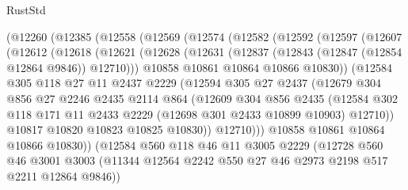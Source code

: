 \begin{lexlean}{RustStd}
\begin{coremodule}
    (@12260
      (@12385
        (@12558
          (@12569
            (@12574
              (@12582
                (@12592
                  (@12597
                    (@12607
                      (@12612
                        (@12618
                          (@12621
                            (@12628
                              (@12631 (@12837 (@12843 (@12847 (@12854 @12864 @9846)) @12710)))
                              @10858
                              @10861
                              @10864
                              @10866
                              @10830))
                          (@12584
                            @305
                            @118
                            @27
                            @11
                            @2437
                            @2229
                            (@12594
                              @305
                              @27
                              @2437
                              (@12679
                                @304
                                @856
                                @27
                                @2246
                                @2435
                                @2114
                                @864
                                (@12609
                                  @304
                                  @856
                                  @2435
                                  (@12584
                                    @302
                                    @118
                                    @171
                                    @11
                                    @2433
                                    @2229
                                    (@12698 @301 @2433 @10899 @10903)
                                    @12710))
                                @10817
                                @10820
                                @10823
                                @10825
                                @10830))
                            @12710)))
                      @10858
                      @10861
                      @10864
                      @10866
                      @10830))
                  (@12584
                    @560
                    @118
                    @46
                    @11
                    @3005
                    @2229
                    (@12728
                      @560
                      @46
                      @3001
                      @3003
                      (@11344 @12564 @2242 @550 @27 @46 @2973 @2198 @517 @2211 @12864 @9846))

\end{coremodule}
\end{lexlean}
